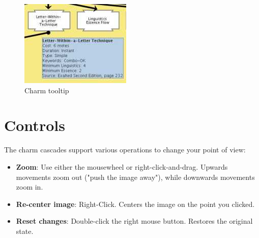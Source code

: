 \begin{figure}[htbp]
	\centering
		\includegraphics{images/CharmTooltip.jpg}
	\caption{Charm tooltip}
	\label{fig:CharmTooltip}
\end{figure}

\section{Controls}
The charm cascades support various operations to change your point of view:

\begin{itemize}
	\item{\textbf{Zoom}:} Use either the mousewheel or right-click-and-drag. Upwards movements zoom out ("push the image away"), while downwards movements zoom in.
	\item{\textbf{Re-center image}:} Right-Click. Centers the image on the point you clicked.
	\item{\textbf{Reset changes}:} Double-click the right mouse button. Restores the original state.
\end{itemize}